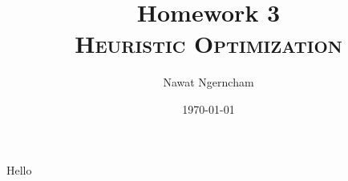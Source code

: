 \documentclass{article}
\title{\Huge{Homework 3}
	\\
	\Large\scshape{Heuristic Optimization}}
\author{Nawat Ngerncham}
\date{\today}
\begin{document}
\maketitle
	
Hello
\end{document}
